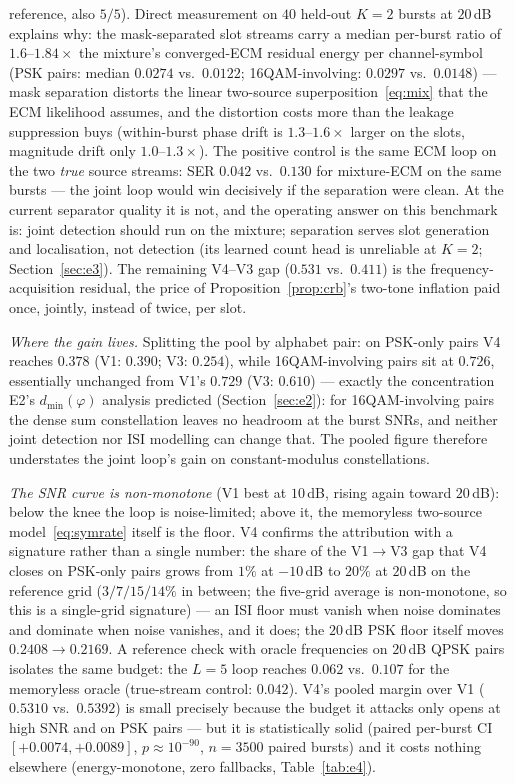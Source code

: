 \documentclass[journal]{IEEEtran}
\begin{document}
reference, also $5/5$). Direct measurement on $40$ held-out $K{=}2$
bursts at $20$\,dB explains why: the
mask-separated slot streams carry a median per-burst ratio of
$1.6$--$1.84\times$ the mixture's
converged-ECM residual energy per channel-symbol (PSK pairs: median
$0.0274$ vs.\ $0.0122$; 16QAM-involving: $0.0297$ vs.\ $0.0148$) ---
mask separation distorts the linear two-source superposition~\eqref{eq:mix} that the
ECM likelihood assumes, and the distortion costs more than the leakage
suppression buys (within-burst phase drift is $1.3$--$1.6\times$
larger on the slots, magnitude drift only $1.0$--$1.3\times$). The positive control is the same ECM loop on the
two \emph{true} source streams: SER $0.042$ vs.\ $0.130$ for
mixture-ECM on the same bursts --- the joint loop would win decisively
if the separation were clean. At the current separator quality
it is not, and the operating answer on this benchmark is: joint
detection should run on the mixture; separation serves slot generation
and localisation, not detection (its learned count head is unreliable
at $K{=}2$; Section~\ref{sec:e3}). The remaining V4--V3 gap ($0.531$ vs.\
$0.411$) is the frequency-acquisition residual, the price of
Proposition~\ref{prop:crb}'s two-tone inflation paid once, jointly,
instead of twice, per slot.

\emph{Where the gain lives.} Splitting the pool by
alphabet pair: on PSK-only pairs V4 reaches $0.378$ (V1: $0.390$; V3:
$0.254$), while 16QAM-involving pairs sit at $0.726$, essentially
unchanged from V1's $0.729$ (V3: $0.610$) --- exactly the
concentration E2's
$d_{\min}(\varphi)$ analysis predicted (Section~\ref{sec:e2}): for
16QAM-involving pairs the dense sum constellation leaves no headroom at
the burst SNRs, and neither joint detection nor ISI modelling can
change that. The pooled figure therefore understates the joint
loop's gain on constant-modulus constellations.

\emph{The SNR curve is non-monotone} (V1 best at $10$\,dB, rising again
toward $20$\,dB): below the knee the loop is noise-limited; above it,
the memoryless two-source model~\eqref{eq:symrate} itself is the
floor. V4 confirms the attribution with a
signature rather than a single number: the share of the V1$\to$V3 gap
that V4 closes on PSK-only pairs grows from $1\%$ at
$-10$\,dB to $20\%$ at
$20$\,dB on the reference grid ($3/7/15/14\%$ in between; the
five-grid average is non-monotone, so this is a single-grid signature) --- an ISI floor must vanish when
noise dominates and dominate when noise vanishes, and it does; the
$20$\,dB PSK floor itself moves $0.2408 \to 0.2169$. A reference
check with oracle frequencies on $20$\,dB QPSK pairs isolates the same
budget: the $L{=}5$ loop reaches $0.062$ vs.\ $0.107$ for the
memoryless oracle (true-stream control: $0.042$). V4's pooled margin over V1
($0.5310$ vs.\ $0.5392$) is small precisely because the budget it
attacks only opens at high SNR and on PSK pairs --- but it is
statistically solid (paired per-burst CI $[+0.0074, +0.0089]$,
$p \approx 10^{-90}$, $n{=}3500$ paired bursts) and it costs
nothing elsewhere (energy-monotone, zero fallbacks,
Table~\ref{tab:e4}).
\end{document}
